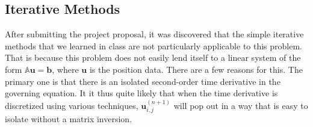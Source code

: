\documentclass{homework}
\begin{document}
\subsection{Iterative Methods}
After submitting the project proposal, it was discovered that the simple iterative methods that we learned in class are not particularly applicable to this problem. That is because this problem does not easily lend itself to a linear system of the form $\mathbb{A} \mathbf{u} = \mathbf{b}$, where $\mathbf{u}$ is the position data. There are a few reasons for this. The primary one is that there is an isolated second-order time derivative in the governing equation. It it thus quite likely that when the time derivative is discretized using various techniques, $\mathbf{u}_{i,j}^{(n+1)}$ will pop out in a way that is easy to isolate without a matrix inversion. %
\end{document}
